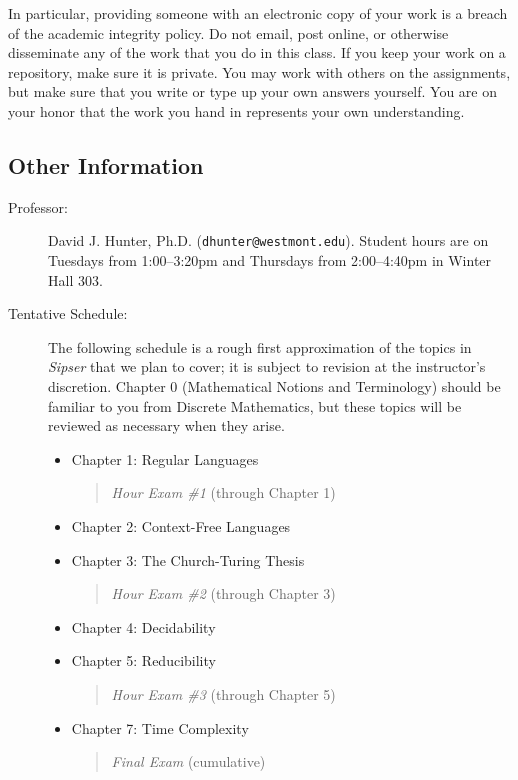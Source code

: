 \documentclass[
  twoside]{article}
\begin{document}
In particular, providing someone with an electronic copy of your work is
a breach of the academic integrity policy. Do not email, post online, or
otherwise disseminate any of the work that you do in this class. If you
keep your work on a repository, make sure it is private. You may work
with others on the assignments, but make sure that you write or type up
your own answers yourself. You are on your honor that the work you hand
in represents your own understanding.

\clearpage

\hypertarget{other-information}{%
\subsection{Other Information}\label{other-information}}

\begin{description} 

\item[Professor:] David J. Hunter, Ph.D.
  (\verb!dhunter@westmont.edu!). Student hours are on Tuesdays from 1:00--3:20pm and Thursdays from 2:00--4:40pm in Winter Hall 303.

 \item[Tentative Schedule:] The following schedule is a rough first approximation of the topics in \textit{Sipser} that we plan to cover; it is subject to revision at the instructor's discretion. Chapter 0 (Mathematical Notions and Terminology) should be familiar to you from Discrete Mathematics, but these topics will be reviewed as necessary when they arise.
  \begin{itemize}
      \item Chapter 1: Regular Languages
         \begin{quote}
          \textit{Hour Exam \#1}     (through Chapter 1)
         \end{quote}
      \item Chapter 2: Context-Free Languages
      \item Chapter 3: The Church-Turing Thesis
         \begin{quote}
          \textit{Hour Exam \#2}     (through Chapter 3)
         \end{quote}
      \item Chapter 4: Decidability
      \item Chapter 5: Reducibility
         \begin{quote}
          \textit{Hour Exam \#3}     (through Chapter 5)
         \end{quote}
      \item Chapter 7: Time Complexity 
   \begin{quote}
    \textit{Final Exam}     (cumulative)
   \end{quote}
  \end{itemize}


\end{description}
\end{document}
